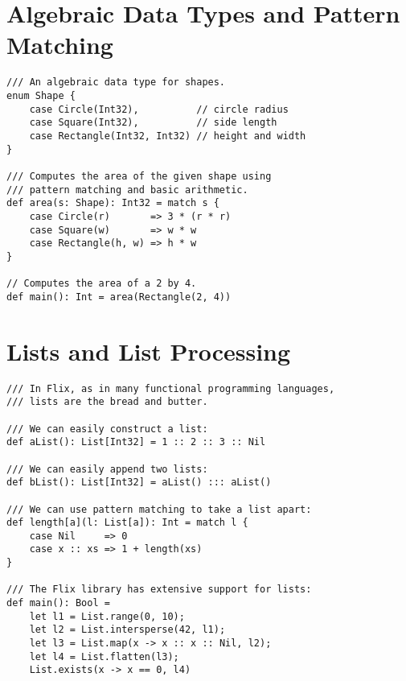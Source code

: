 \documentclass{article}
\begin{document}
\section{Algebraic Data Types and Pattern Matching}

\begin{lstlisting}
/// An algebraic data type for shapes.
enum Shape {
    case Circle(Int32),          // circle radius
    case Square(Int32),          // side length
    case Rectangle(Int32, Int32) // height and width
}

/// Computes the area of the given shape using 
/// pattern matching and basic arithmetic.
def area(s: Shape): Int32 = match s {
    case Circle(r)       => 3 * (r * r)
    case Square(w)       => w * w
    case Rectangle(h, w) => h * w
}

// Computes the area of a 2 by 4.
def main(): Int = area(Rectangle(2, 4))    
\end{lstlisting}

\section{Lists and List Processing}

\begin{lstlisting}
/// In Flix, as in many functional programming languages, 
/// lists are the bread and butter.

/// We can easily construct a list:
def aList(): List[Int32] = 1 :: 2 :: 3 :: Nil

/// We can easily append two lists:
def bList(): List[Int32] = aList() ::: aList()

/// We can use pattern matching to take a list apart:
def length[a](l: List[a]): Int = match l {
    case Nil     => 0
    case x :: xs => 1 + length(xs) 
}

/// The Flix library has extensive support for lists:
def main(): Bool = 
    let l1 = List.range(0, 10);
    let l2 = List.intersperse(42, l1);
    let l3 = List.map(x -> x :: x :: Nil, l2);
    let l4 = List.flatten(l3);
    List.exists(x -> x == 0, l4)
\end{lstlisting}
\end{document}
